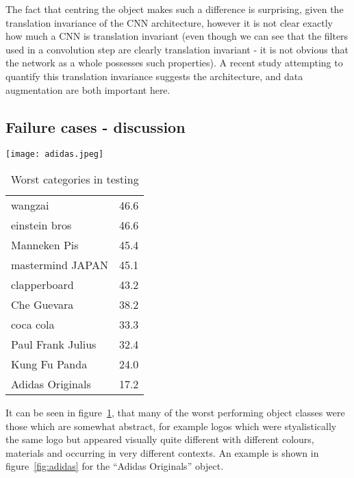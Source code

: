 \documentclass[conference]{IEEEtran}
\begin{document}
The fact that centring the object makes such a difference is surprising, given the translation invariance of the CNN architecture, however it is not clear exactly how much a CNN is translation invariant (even though we can see that the filters used in a convolution step are clearly translation invariant - it is not obvious that the network as a whole possesses such properties). A recent study attempting to quantify this translation invariance \cite{EricKauderer-Abrams2016} suggests the architecture, and data augmentation are both important here. 


\subsection {Failure cases - discussion}


\begin{figure*}[t]
    \caption{Example of one hard case in the INSTRE dataset}
\centering
\texttt{[image: adidas.jpeg]}
\label{fig:adidas}
\end{figure*}



\begin{table}[h]
  \centering
    \caption{Worst categories in testing }
  \begin{tabular}{ l l }
  wangzai & 46.6 \\
  einstein bros & 46.6\\
  Manneken Pis & 45.4\\
  mastermind JAPAN & 45.1\\
  clapperboard & 43.2\\
  Che Guevara & 38.2\\
  coca cola & 33.3\\
  Paul Frank Julius & 32.4\\
  Kung Fu Panda & 24.0\\
  Adidas Originals & 17.2\\
    \bottomrule
  \end{tabular}
\label{fig:failure}
\end{table}

It can be seen in figure~\ref{fig:failure}, that many of the worst performing object classes were those which are somewhat abstract, for example logos which were styalistically the same logo but appeared visually quite different with different colours, materials and occurring in very different contexts. An example is shown in figure~\ref{fig:adidas} for the ``Adidas Originals'' object.
\end{document}
